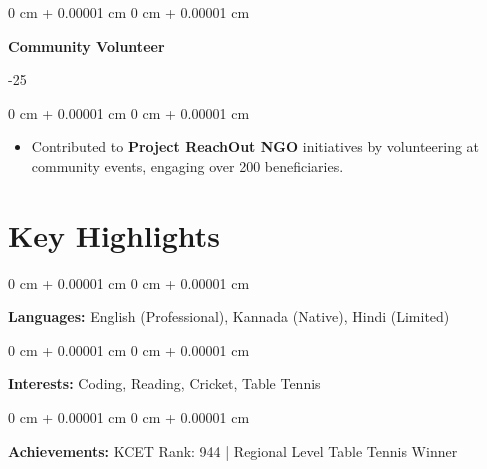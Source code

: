 \documentclass[10pt, letterpaper]{article}
\newenvironment{highlights}{
    \begin{itemize}[
        topsep=0.10 cm,
        parsep=0.10 cm,
        partopsep=0pt,
        itemsep=0pt,
        leftmargin=0 cm + 10pt
    ]
}{
    \end{itemize}
} %
\newenvironment{onecolentry}{
    \begin{adjustwidth}{
        0 cm + 0.00001 cm
    }{
        0 cm + 0.00001 cm
    }
}{
    \end{adjustwidth}
} %
\newenvironment{twocolentry}[2][]{
    \onecolentry
    \def\secondColumn{#2}
    \setcolumnwidth{\fill, 4.5 cm}
    \begin{paracol}{2}
}{
    \switchcolumn \raggedleft \secondColumn
    \end{paracol}
    \endonecolentry
} %
\begin{document}
\vspace{0.2 cm}

\begin{twocolentry}{
    2024-25
}
    \textbf{\textcolor{blueHighlight}{Community Volunteer}}
\end{twocolentry}

\vspace{0.05 cm}
\begin{onecolentry}
    \begin{highlights}
        \item Contributed to \textbf{Project ReachOut NGO} initiatives by volunteering at community events, engaging over 200 beneficiaries.
    \end{highlights}
\end{onecolentry}
    \section{Key Highlights}

        \begin{onecolentry}
            \textbf{Languages:} English (Professional), Kannada (Native), Hindi (Limited)
        \end{onecolentry}

        \vspace{0.2 cm}

        \begin{onecolentry}
            \textbf{Interests:} Coding, Reading, Cricket, Table Tennis
        \end{onecolentry}

        \vspace{0.2 cm}

        \begin{onecolentry}
            \textbf{Achievements:} KCET Rank: 944 | Regional Level Table Tennis Winner
        \end{onecolentry}
   
\end{document}
